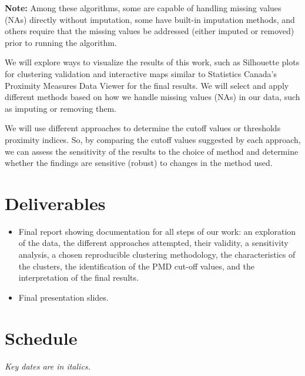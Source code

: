 \documentclass[11pt, a4paper]{article}
\begin{document}
\textbf{Note:} Among these algorithms, some are capable of handling missing values (NAs) directly without imputation, some have built-in imputation methods, and others require that the missing values be addressed (either imputed or removed) prior to running the algorithm. 
\par
We will explore ways to visualize the results of this work, such as Silhouette plots for clustering validation and interactive maps similar to Statistics Canada’s Proximity Measures Data Viewer for the final results. We will select and apply different methods based on how we handle missing values (NAs) in our data, such as imputing or removing them.
\par
We will use different approaches to determine the cutoff values or thresholds proximity indices. So, by comparing the cutoff values suggested by each approach, we can assess the sensitivity of the results to the choice of method and determine whether the findings are sensitive (robust) to changes in the method used. 




\section*{Deliverables}

\begin{itemize}
\item Final report showing documentation for all steps of our work: an exploration of the data, the different approaches attempted, their validity, a sensitivity analysis, a chosen reproducible clustering methodology, the characteristics of the clusters, the identification of the PMD cut-off values, and the interpretation of the final results.
\item Final presentation slides.
\end{itemize}




\pagebreak
\section*{Schedule}

\textit{Key dates are in italics.}
\end{document}
